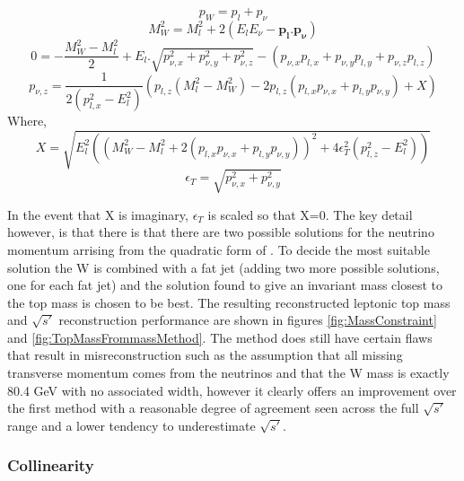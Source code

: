 \begin{equation}
  p_W=p_l+p_\nu
\end{equation}
\begin{equation}
M_W^2=M_l^2 + 2(E_lE_\nu - \mathbf{p_l.p_\nu})
\end{equation}
\begin{equation}
0=-\frac{M_W^2-M_l^2}{2} + E_l.\sqrt{p^2_{\nu , x}+p^2_{\nu , y}+p^2_{\nu , z}} - (p_{\nu , x}p_{l , x}+p_{\nu , y}p_{l , y}+p_{\nu , z}p_{l , z})
\end{equation}
\begin{equation}
p_{\nu , z}=\frac{1}{2(p^2_{l , x}-E^2_{l})} (p_{l , z}(M_l^2-M_W^2)-2p_{l , z}(p_{l , x}p_{\nu , x}+p_{l , y}p_{\nu , y}) + X)
\end{equation}
Where,
\begin{equation}
  \label{eq:X}
  X=\sqrt{E_l^2((M_W^2-M_l^2 +2(p_{l , x}p_{\nu , x}+p_{l , y}p_{\nu , y}))^2 +4\epsilon_T^2(p^2_{l , z}-E_l^2) )}
\end{equation}
\begin{equation}
  \epsilon_T=\sqrt{p^2_{\nu , x}+p^2_{\nu , y}}
\end{equation}

In the event that X is imaginary, $\epsilon_T$ is scaled so that X=0. The key detail however, is that there is that there are two possible solutions for the neutrino momentum arrising from the quadratic form of . To decide the most suitable solution the W is combined with a fat jet (adding two more possible solutions, one for each fat jet) and the solution found to give an invariant mass closest to the top mass is chosen to be best. The resulting reconstructed leptonic top mass and $\sqrt{s'}$ reconstruction performance are shown in figures \ref{fig:MassConstraint} and \ref{fig:TopMassFrommassMethod}. The method does still have certain flaws that result in misreconstruction such as the assumption that all missing transverse momentum comes from the neutrinos and that the W mass is exactly 80.4 GeV with no associated width, however it clearly offers an improvement over the first method with a reasonable degree of agreement seen across the full $\sqrt{s'}$ range and a lower tendency to underestimate $\sqrt{s'}$.

\subsubsection{Collinearity}

